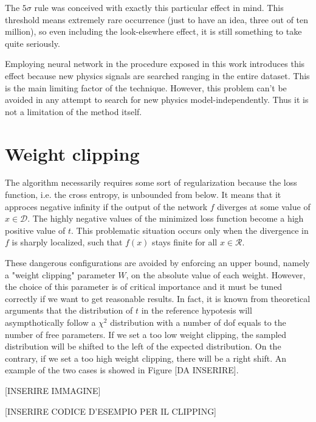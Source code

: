 The $5\sigma$ rule was conceived with exactly this particular effect in mind. This threshold means extremely rare occurrence (just to have an idea, three out of ten million), so even including the look-elsewhere effect, it is still something to take quite seriously.

Employing neural network in the procedure exposed in this work introduces this effect because new physics signals are searched ranging in the entire dataset. This is the main limiting factor of the technique. However, this problem can't be avoided in any attempt to search for new physics model-independently. Thus it is not a limitation of the method itself.





\section{Weight clipping}
The algorithm necessarily requires some sort of regularization because the loss function, i.e. the cross entropy, is unbounded from below. It means that it approces negative infinity if the output of the network $f$ diverges at some value of $x \in \mathcal{D}$. The highly negative values of the minimized loss function become a high positive value of $t$. This problematic situation occurs only when the divergence in $f$ is sharply localized, such that $f(x)$ stays finite for all $x \in \mathcal{R}$.

These dangerous configurations are avoided by enforcing an upper bound, namely a "weight clipping" parameter $W$, on the absolute value of each weight. However, the choice of this parameter is of critical importance and it must be tuned correctly if we want to get reasonable results. In fact, it is known from theoretical arguments that the distribution of $t$ in the reference hypotesis will asympthotically follow a $\chi^2$ distribution with a number of dof equals to the number of free parameters. If we set a too low weight clipping, the sampled distribution will be shifted to the left of the expected distribution. On the contrary, if we set a too high weight clipping, there will be a right shift. An example of the two cases is showed in Figure [DA INSERIRE].

[INSERIRE IMMAGINE]

[INSERIRE CODICE D'ESEMPIO PER IL CLIPPING]